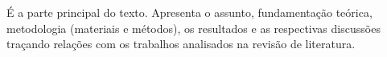 É a parte principal do texto. Apresenta o assunto, fundamentação teórica, metodologia (materiais e métodos), os resultados e as respectivas discussões traçando relações com os trabalhos analisados na revisão de literatura.

